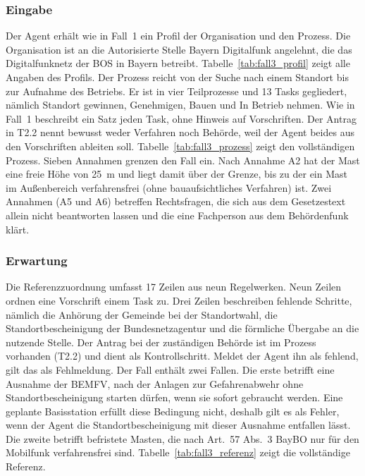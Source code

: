 \subsubsection{Eingabe}\label{sec:fall3_eingabe}
Der Agent erhält wie in Fall~1 ein Profil der Organisation und den Prozess.
Die Organisation ist an die Autorisierte Stelle Bayern Digitalfunk angelehnt, die das Digitalfunknetz der BOS in Bayern betreibt.
Tabelle~\ref{tab:fall3_profil} zeigt alle Angaben des Profils.
Der Prozess reicht von der Suche nach einem Standort bis zur Aufnahme des Betriebs.
Er ist in vier Teilprozesse und 13 Tasks gegliedert, nämlich Standort gewinnen, Genehmigen, Bauen und In Betrieb nehmen.
Wie in Fall~1 beschreibt ein Satz jeden Task, ohne Hinweis auf Vorschriften.
Der Antrag in T2.2 nennt bewusst weder Verfahren noch Behörde, weil der Agent beides aus den Vorschriften ableiten soll.
Tabelle~\ref{tab:fall3_prozess} zeigt den vollständigen Prozess.
Sieben Annahmen grenzen den Fall ein.
Nach Annahme A2 hat der Mast eine freie Höhe von 25~m und liegt damit über der Grenze, bis zu der ein Mast im Außenbereich verfahrensfrei (ohne bauaufsichtliches Verfahren) ist.
Zwei Annahmen (A5 und A6) betreffen Rechtsfragen, die sich aus dem Gesetzestext allein nicht beantworten lassen und die eine Fachperson aus dem Behördenfunk klärt.

\subsubsection{Erwartung}\label{sec:fall3_erwartung}
Die Referenzzuordnung umfasst 17 Zeilen aus neun Regelwerken.
Neun Zeilen ordnen eine Vorschrift einem Task zu.
Drei Zeilen beschreiben fehlende Schritte, nämlich die Anhörung der Gemeinde bei der Standortwahl, die Standortbescheinigung der Bundesnetzagentur und die förmliche Übergabe an die nutzende Stelle.
Der Antrag bei der zuständigen Behörde ist im Prozess vorhanden (T2.2) und dient als Kontrollschritt.
Meldet der Agent ihn als fehlend, gilt das als Fehlmeldung.
Der Fall enthält zwei Fallen.
Die erste betrifft eine Ausnahme der BEMFV, nach der Anlagen zur Gefahrenabwehr ohne Standortbescheinigung starten dürfen, wenn sie sofort gebraucht werden.
Eine geplante Basisstation erfüllt diese Bedingung nicht, deshalb gilt es als Fehler, wenn der Agent die Standortbescheinigung mit dieser Ausnahme entfallen lässt.
Die zweite betrifft befristete Masten, die nach Art.~57 Abs.~3 BayBO nur für den Mobilfunk verfahrensfrei sind.
Tabelle~\ref{tab:fall3_referenz} zeigt die vollständige Referenz.

